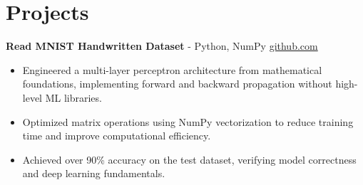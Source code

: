 \documentclass[11pt]{article}       %
\begin{document}

\vspace{-18.5pt}

\section*{Projects}

\textbf{Read MNIST Handwritten Dataset}{ - Python, NumPy} \hfill \href{https://github.com/Monica20030707/Artificial-Neutral-Network_ML}{github.com} \\
\vspace{-9pt}
\begin{itemize}
  \item Engineered a multi-layer perceptron architecture from mathematical foundations, implementing forward and backward propagation without high-level ML libraries.
  \item Optimized matrix operations using NumPy vectorization to reduce training time and improve computational efficiency.
  \item Achieved over 90\% accuracy on the test dataset, verifying model correctness and deep learning fundamentals.
\end{itemize}

\end{document}
